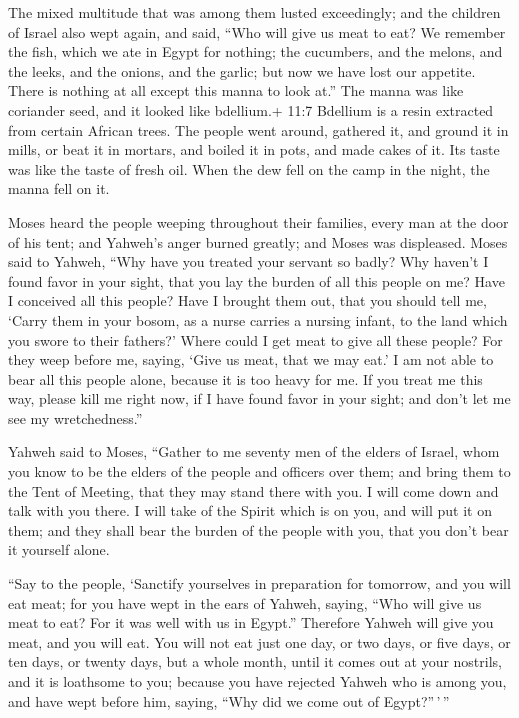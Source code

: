  The mixed multitude that was among them lusted exceedingly;
and the children of Israel also wept again, and said, ``Who will give us
meat to eat?  We remember the fish, which we ate in Egypt
for nothing; the cucumbers, and the melons, and the leeks, and the
onions, and the garlic;  but now we have lost our appetite.
There is nothing at all except this manna to look at.''  The
manna was like coriander seed, and it looked like bdellium.+ 11:7
Bdellium is a resin extracted from certain African trees. 
The people went around, gathered it, and ground it in mills, or beat it
in mortars, and boiled it in pots, and made cakes of it. Its taste was
like the taste of fresh oil.  When the dew fell on the camp
in the night, the manna fell on it.

 Moses heard the people weeping throughout their families,
every man at the door of his tent; and Yahweh's anger burned greatly;
and Moses was displeased.  Moses said to Yahweh, ``Why have
you treated your servant so badly? Why haven't I found favor in your
sight, that you lay the burden of all this people on me? 
Have I conceived all this people? Have I brought them out, that you
should tell me, `Carry them in your bosom, as a nurse carries a nursing
infant, to the land which you swore to their fathers?' 
Where could I get meat to give all these people? For they weep before
me, saying, `Give us meat, that we may eat.'  I am not able
to bear all this people alone, because it is too heavy for me.
 If you treat me this way, please kill me right now, if I
have found favor in your sight; and don't let me see my wretchedness.''

 Yahweh said to Moses, ``Gather to me seventy men of the
elders of Israel, whom you know to be the elders of the people and
officers over them; and bring them to the Tent of Meeting, that they may
stand there with you.  I will come down and talk with you
there. I will take of the Spirit which is on you, and will put it on
them; and they shall bear the burden of the people with you, that you
don't bear it yourself alone.

 ``Say to the people, `Sanctify yourselves in preparation
for tomorrow, and you will eat meat; for you have wept in the ears of
Yahweh, saying, ``Who will give us meat to eat? For it was well with us
in Egypt.'' Therefore Yahweh will give you meat, and you will eat.
 You will not eat just one day, or two days, or five days,
or ten days, or twenty days,  but a whole month, until it
comes out at your nostrils, and it is loathsome to you; because you have
rejected Yahweh who is among you, and have wept before him, saying,
``Why did we come out of Egypt?''\,'\,''

